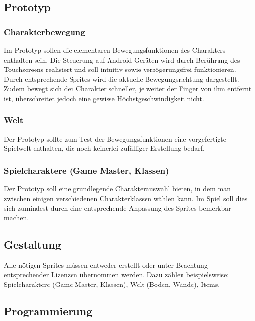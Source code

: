 \documentclass[10pt,a4paper,notitlepage]{report}
\begin{document}
\begin{flushleft}
\subsection{Prototyp}

\subsubsection{Charakterbewegung}
Im Prototyp sollen die elementaren Bewegungsfunktionen des Charakters enthalten sein. Die Steuerung auf Android-Geräten wird durch Berührung des Touchscreens realisiert und soll intuitiv sowie verzögerungsfrei funktionieren. Durch entsprechende Sprites wird die aktuelle Bewegungsrichtung dargestellt. Zudem bewegt sich der Charakter schneller, je weiter der Finger von ihm entfernt ist, überschreitet jedoch eine gewisse Höchstgeschwindigkeit nicht.

\subsubsection{Welt}
Der Prototyp sollte zum Test der Bewegungsfunktionen eine vorgefertigte Spielwelt enthalten, die noch keinerlei zufälliger Erstellung bedarf.

\subsubsection{Spielcharaktere (Game Master, Klassen)}
Der Prototyp soll eine grundlegende Charakterauswahl bieten, in dem man zwischen einigen verschiedenen Charakterklassen wählen kann. Im Spiel soll dies sich zumindest durch eine entsprechende Anpassung des Sprites bemerkbar machen.

\subsection{Gestaltung}
Alle nötigen Sprites müssen entweder erstellt oder unter Beachtung entsprechender Lizenzen übernommen werden. Dazu zählen beispielsweise: Spielcharaktere (Game Master, Klassen), Welt (Boden, Wände), Items.

\subsection{Programmierung}


\end{flushleft}
\end{document}
